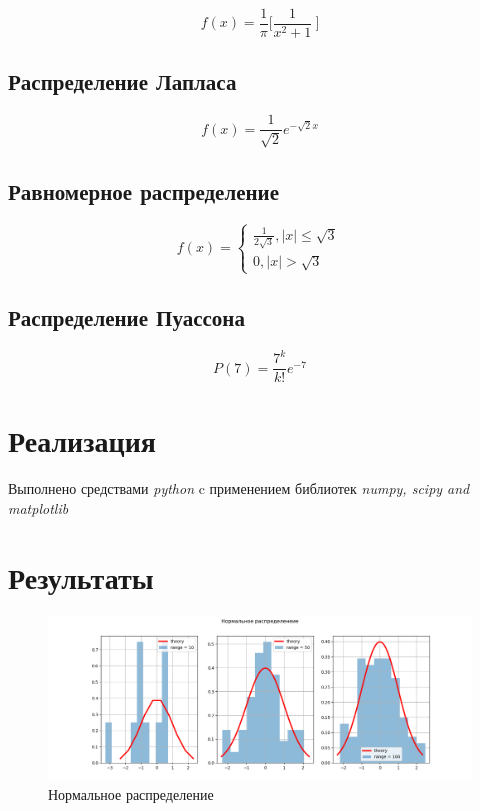 \documentclass[12pt]{article}
\begin{document}
\begin{equation}
f(x)= \frac{1}{\pi}\bigg[ \frac{1}{x^2 + 1}\ \bigg]
\end{equation}

\subsection{Распределение Лапласа}

\begin{equation} 
f(x)= \frac{1}{\sqrt{2}}e^{-\sqrt{2}x}
\end{equation}

\subsection{Равномерное распределение}

\begin{equation}
      f(x) = 
      \begin{cases}
      \frac{1}{2\sqrt{3}}, |x| \leq \sqrt{3} \\
      0, |x| > \sqrt{3}
      \end{cases}
\end{equation}



\subsection{Распределение Пуассона}

\begin{equation} \label{eq5}
P(7) = \frac{7^k}{k!}e^{-7}
\end{equation}

\pagebreak

\section{Реализация}
Выполнено средствами \textit{python} c применением библиотек \textit{numpy, scipy and matplotlib}

\section{Результаты}

\begin{figure}[h!]
\begin{center}
\includegraphics[width=1\textwidth]{normal.png} 
\caption{Нормальное распределение}
\end{center}
\end{figure}
\end{document}
